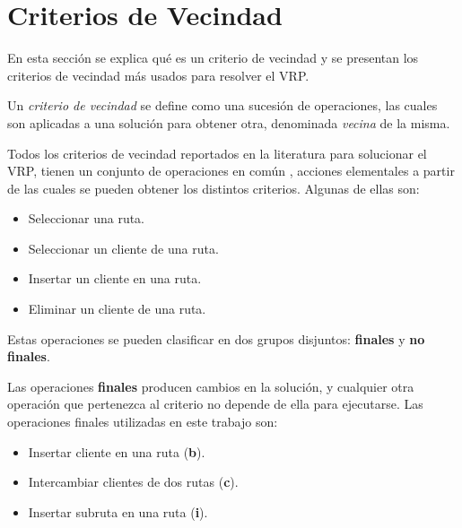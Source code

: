 \documentclass[a4paper,10pt,twocolumn]{article}
\begin{document}
\section{Criterios de Vecindad}\label{sec:nbhCrit}

	En esta sección se explica qué es un criterio de vecindad y se presentan los 
	criterios de vecindad más usados para resolver el VRP.

  	Un \textit{criterio de vecindad} se define como una sucesión de operaciones, las
  	cuales son aplicadas a una solución para obtener otra, denominada \textit{vecina}
  	de la misma.

  	Todos los criterios de vecindad reportados en la literatura para solucionar el VRP,
  	\cite{Paolo, Alina} tienen un conjunto de operaciones en común \cite{Camila}, acciones elementales a 
  	partir de las cuales se pueden obtener los distintos criterios. Algunas de ellas son:
  	\begin{itemize}
  		\renewcommand{\labelitemi}{\tiny $\blacksquare$}
  		\item Seleccionar una ruta.
  		\item Seleccionar un cliente de una ruta.
  		\item Insertar un cliente en una ruta.
  		\item Eliminar un cliente de una ruta.
  	\end{itemize}

  	Estas operaciones se pueden clasificar en dos grupos disjuntos: \textbf{finales} y 
  	\textbf{no finales}.

	Las operaciones \textbf{finales} producen cambios en la solución, y cualquier 
	otra operación que pertenezca al criterio no depende de ella para ejecutarse. Las
	operaciones finales utilizadas en este trabajo son:
	
	\begin{itemize} %
		\item Insertar cliente en una ruta (\textbf{b}).
		\item Intercambiar clientes de dos rutas (\textbf{c}).
		\item Insertar subruta en una ruta (\textbf{i}). %
	\end{itemize}
\end{document}
